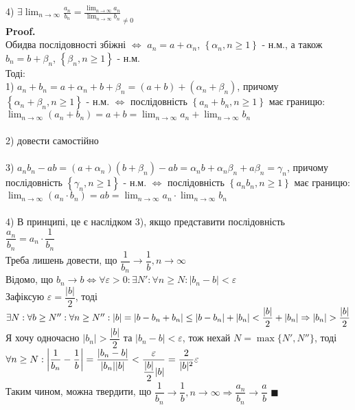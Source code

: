 \documentclass[a4paper, 14pt]{extarticle}
\def\qed{$\blacksquare$}
\def\sequence#1{$\displaystyle \left\{ {#1}, n\geq1 \right\}$}
\begin{document}
	4) $\displaystyle \exists \lim_{n \to \infty} \frac{a_n}{b_n} = \frac{\displaystyle \lim_{n \to \infty} a_n}{\displaystyle \lim_{n \to \infty} b_n}_{\neq 0}$\\
	\textbf{Proof.}\\
	Обидва послідовності збіжні $\iff$ $a_n = a + \alpha_n$, \sequence{\alpha_n} - н.м., а також $b_n=b+\beta_n$, \sequence{\beta_n} - н.м.\\
	Тоді:\\
	1) $a_n+b_n=a+\alpha_n+b+\beta_n=(a+b)+(\alpha_n+\beta_n)$, причому \sequence{\alpha_n + \beta_n} - н.м. $\iff$ послідовність \sequence{a_n+b_n} має границю:\\ $\displaystyle \lim_{n \to \infty} (a_n+b_n) = a+b = \lim_{n \to \infty} a_n+\lim_{n \to \infty} b_n$\\ \\
	2) довести самостійно\\ \\
	3) $a_n b_n - ab = (a+\alpha_n)(b+\beta_n) - ab = \alpha_n b + \alpha_n \beta_n + a \beta_n = \gamma_n$, причому послідовність \sequence{\gamma_n} - н.м. $\iff$ послідовність \sequence{a_n b_n} має границю:\\
	$\displaystyle \lim_{n \to \infty} (a_n \cdot b_n) = ab = \lim_{n \to \infty} a_n \cdot \lim_{n \to \infty} b_n$\\ \\
	4) В принципі, це є наслідком 3), якщо представити послідовність \\ $\dfrac{a_n}{b_n} = a_n \cdot \dfrac{1}{b_n}$\\
	Треба лишень довести, що $\dfrac{1}{b_n} \to \dfrac{1}{b}, n \to \infty$\\
	Відомо, що $b_n \to b \iff \forall \varepsilon > 0: \exists N': \forall n \geq N: |b_n-b| < \varepsilon$\\
	Зафіксую $\varepsilon = \dfrac{|b|}{2}$, тоді $\exists N: \forall b \geq N'': \forall n \geq N'': \\ |b| = |b - b_n + b_n| \leq |b - b_n| + |b_n| < \dfrac{|b|}{2} + |b_n| \Rightarrow |b_n| > \dfrac{|b|}{2}$\\
	Я хочу одночасно $|b_n| > \dfrac{|b|}{2}$ та $|b_n - b| < \varepsilon$, тож нехай $N = \max \{N', N'' \}$, тоді\\
	$\forall n \geq N: \abs{\dfrac{1}{b_n} - \dfrac{1}{b}} = \dfrac{|b_n -b|}{|b_n| |b|} < \dfrac{\varepsilon}{ \dfrac{|b|}{2} |b|} = \dfrac{2}{|b|^2} \varepsilon$\\
	Таким чином, можна твердити, що $\dfrac{1}{b_n} \to \dfrac{1}{b}, n \to \infty \Rightarrow \dfrac{a_n}{b_n} \to \dfrac{a}{b}$ \qed
\end{document}
